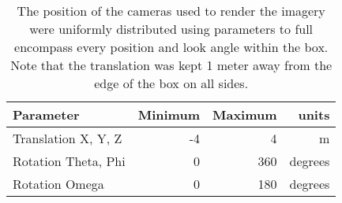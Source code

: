 \begin{table}[htbp]
  \centering
  \caption{The position of the cameras used to render the imagery were uniformly distributed using parameters to full encompass every position and look angle within the box.  Note that the translation was kept 1 meter away from the edge of the box on all sides.}
    \begin{tabular}{lrrr}
    	\toprule
    Parameter & Minimum & Maximum & units \\
    \midrule
    Translation X, Y, Z & -4    & 4     & m \\
    Rotation Theta, Phi & 0     & 360   & degrees \\
    Rotation Omega & 0     & 180   & degrees \\
    \bottomrule
    \end{tabular}%
  \label{tab:paramdist}%
\end{table}%
